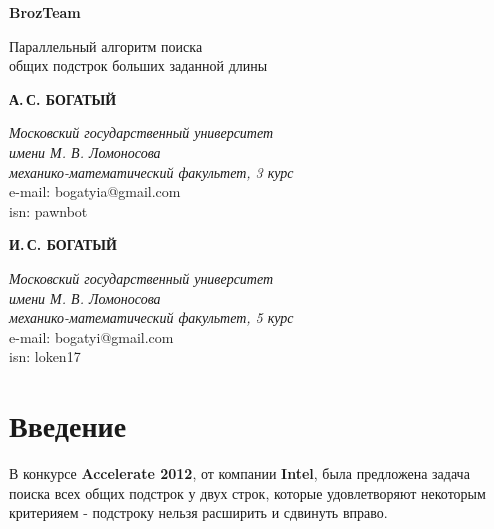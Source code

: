 \documentclass[12pt,a4paper]{article}
\begin{document}
\newcommand{\parw}[2]{\dfrac{\partial #1}{\partial #2}}
\newcommand{\pl}{p_{\lambda}}
\newcommand{\pa}{p_{a}}
\newcommand{\mn}[1]{ \{ {#1} \} }
\newcommand{\pgm}{p_{m, \sigma^2}}
\newcommand{\pma}{p_{M, a}}
\newcommand{\xseqn}{x_1, \ldots, x_n}
\newcommand{\nd}[1]{\frac{1}{\sqrt{2 \pi #1^2}} \exp ( -{\frac{x^2}{2 #1^2}} ) }
\newcommand{\ndm}[2]{\frac{1}{\sqrt{2 \pi #2^2}} \exp ( - {\frac{(x - #1)^2}{2 #2^2}})}
\newcommand{\ndms}[3]{\frac{1}{(\sqrt{2 \pi #2^2})^n} \exp ( - \sum\limits_{i = 1}^{#3}{\frac{(x_i - #1)^2}{2 #2^2}})}
\renewcommand{\le}{\leqslant}
\renewcommand{\ge}{\geqslant}

\newcommand*{\hm}[1]{#1\nobreak\discretionary{}%
{\hbox{$\mathsurround=0pt #1$}}{}}

\begin{titlepage}
\begin{center}
\huge{\textbf{BrozTeam}

\bigskip
\Large{Параллельный алгоритм поиска\\общих подстрок больших заданной длины}}
\end{center}

\begin{flushright}
\textbf{А.\,С. БОГАТЫЙ}

\textit{Московский государственный университет\\имени М. В. Ломоносова\\механико-математический факультет, 3 курс\\}
e-mail: bogatyia@gmail.com\\
isn: pawnbot

\bigskip
\textbf{И.\,С. БОГАТЫЙ}

\textit{Московский государственный университет\\имени М. В. Ломоносова\\механико-математический факультет, 5 курс\\}
e-mail: bogatyi@gmail.com\\
isn: loken17
\\[70pt]
\end{flushright}

\end{titlepage}


\section{Введение}
В конкурсе \textbf{Accelerate 2012},  от компании \textbf{Intel}, была предложена задача поиска всех общих подстрок у двух строк, которые удовлетворяют некоторым критерияем - подстроку нельзя расширить и сдвинуть вправо.
\end{document}
